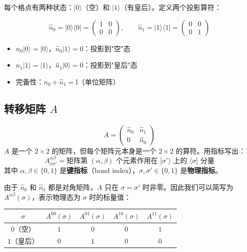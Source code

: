 \documentclass[12pt,a4paper]{article}
\begin{document}
每个格点有两种状态：$|0\rangle$（空）和 $|1\rangle$（有皇后）。定义两个投影算符：

\begin{keybox}[占据数算符]
\[
\hat{n}_0 = |0\rangle\langle 0| = \begin{pmatrix} 1 & 0 \\ 0 & 0 \end{pmatrix}, \qquad
\hat{n}_1 = |1\rangle\langle 1| = \begin{pmatrix} 0 & 0 \\ 0 & 1 \end{pmatrix}
\]
\begin{itemize}
  \item $\hat{n}_0 |0\rangle = |0\rangle$，$\hat{n}_0 |1\rangle = 0$：投影到"空"态
  \item $\hat{n}_1 |1\rangle = |1\rangle$，$\hat{n}_1 |0\rangle = 0$：投影到"皇后"态
  \item 完备性：$\hat{n}_0 + \hat{n}_1 = \mathbb{I}$（单位矩阵）
\end{itemize}
\end{keybox}

\subsection{转移矩阵 $A$}

\begin{keybox}
\[
A = \begin{pmatrix} \hat{n}_0 & \hat{n}_1 \\ 0 & \hat{n}_0 \end{pmatrix}
\]
$A$ 是一个 $2 \times 2$ 的矩阵，但每个矩阵元本身是一个 $2 \times 2$ 的算符。用指标写出：
\[
A^{\alpha\beta}_{\sigma\sigma'} = \text{矩阵第 } (\alpha,\beta) \text{ 个元素作用在 } |\sigma'\rangle \text{ 上的 } \langle\sigma| \text{ 分量}
\]
其中 $\alpha, \beta \in \{0, 1\}$ 是\textbf{键指标}（bond index），$\sigma, \sigma' \in \{0, 1\}$ 是\textbf{物理指标}。
\end{keybox}

由于 $\hat{n}_0$ 和 $\hat{n}_1$ 都是对角矩阵，$A$ 只在 $\sigma = \sigma'$ 时非零。因此我们可以简写为 $A^{\alpha\beta}(\sigma)$，表示物理态为 $\sigma$ 时的标量值：

\begin{center}
\renewcommand{\arraystretch}{1.3}
\begin{tabular}{c|cccc}
\toprule
$\sigma$ & $A^{00}(\sigma)$ & $A^{01}(\sigma)$ & $A^{10}(\sigma)$ & $A^{11}(\sigma)$ \\
\midrule
$0$（空） & $1$ & $0$ & $0$ & $1$ \\
$1$（皇后） & $0$ & $1$ & $0$ & $0$ \\
\bottomrule
\end{tabular}
\end{center}
\end{document}
